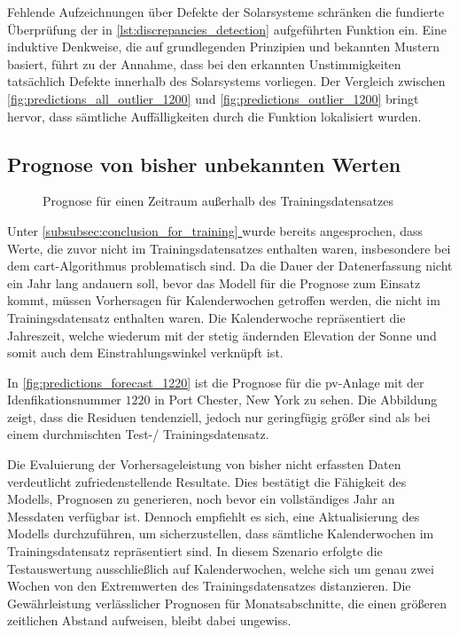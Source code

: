 \documentclass[12pt, a4paper]{article}
\newcommand*{\fullref}[1]{\hyperref[{#1}]{\autoref*{#1} \textit{\nameref*{#1}}}}
\begin{document}
Fehlende Aufzeichnungen über Defekte der Solarsysteme schränken die fundierte Überprüfung der in \autoref{lst:discrepancies_detection} aufgeführten Funktion ein. Eine induktive Denkweise, die auf grundlegenden Prinzipien und bekannten Mustern basiert, führt zu der Annahme, dass bei den erkannten Unstimmigkeiten tatsächlich Defekte innerhalb des Solarsystems vorliegen. Der Vergleich zwischen \autoref{fig:predictions_all_outlier_1200} und \autoref{fig:predictions_outlier_1200} bringt hervor, dass sämtliche Auffälligkeiten durch die Funktion lokalisiert wurden.



\subsection{Prognose von bisher unbekannten Werten}


\begin{figure}[h]
\centering
\def\svgwidth{400pt}

\caption{Prognose für einen Zeitraum außerhalb des Trainingsdatensatzes}
\label{fig:predictions_forecast_1220}
\end{figure}

Unter \fullref{subsubsec:conclusion_for_training} wurde bereits angesprochen, dass Werte, die zuvor nicht im Trainingsdatensatzes enthalten waren, insbesondere bei dem \ac{cart}-Algorithmus problematisch sind. Da die Dauer der Datenerfassung nicht ein Jahr lang andauern soll, bevor das Modell für die Prognose zum Einsatz kommt, müssen Vorhersagen für Kalenderwochen getroffen werden, die nicht im Trainingsdatensatz enthalten waren. Die Kalenderwoche repräsentiert die Jahreszeit, welche wiederum mit der stetig ändernden Elevation der Sonne und somit auch dem Einstrahlungswinkel verknüpft ist.

In \autoref{fig:predictions_forecast_1220} ist die Prognose für die \ac{pv}-Anlage mit der Idenfikationsnummer $1220$ in Port Chester, New York zu sehen. Die Abbildung zeigt, dass die Residuen tendenziell, jedoch nur geringfügig größer sind als bei einem durchmischten Test-/ Trainingsdatensatz.

Die Evaluierung der Vorhersageleistung von bisher nicht erfassten Daten verdeutlicht zufriedenstellende Resultate. Dies bestätigt die Fähigkeit des Modells, Prognosen zu generieren, noch bevor ein vollständiges Jahr an Messdaten verfügbar ist. Dennoch empfiehlt es sich, eine Aktualisierung des Modells durchzuführen, um sicherzustellen, dass sämtliche Kalenderwochen im Trainingsdatensatz repräsentiert sind. In diesem Szenario erfolgte die Testauswertung ausschließlich auf Kalenderwochen, welche sich um genau zwei Wochen von den Extremwerten des Trainingsdatensatzes distanzieren. Die Gewährleistung verlässlicher Prognosen für Monatsabschnitte, die einen größeren zeitlichen Abstand aufweisen, bleibt dabei ungewiss.
\end{document}
